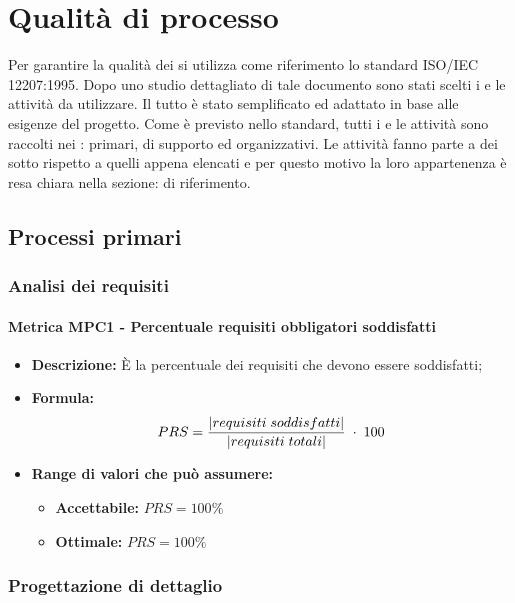 \section{Qualità di processo}
Per garantire la qualità dei  si utilizza come riferimento lo standard ISO/IEC 12207:1995. Dopo uno studio dettagliato di tale documento sono stati scelti i 
e le attività da utilizzare. Il tutto è stato semplificato ed adattato in base alle esigenze del progetto. Come è previsto nello standard, tutti i  e le attività sono raccolti 
nei : primari, di supporto ed organizzativi. Le attività fanno parte a dei sotto  rispetto a quelli appena elencati e per questo motivo la loro 
appartenenza è resa chiara nella sezione:  di riferimento.

\subsection{Processi primari}

\subsubsection{Analisi dei requisiti}
    \paragraph{Metrica MPC1 - Percentuale requisiti obbligatori soddisfatti}
    \begin{itemize}
        \item \textbf{Descrizione:} È la percentuale dei requisiti che devono essere soddisfatti;
        \item \textbf{Formula:} $$PRS = {|requisiti \; soddisfatti| \over |requisiti \; totali|}\; \cdot \; 100$$
        \item \textbf{Range di valori che può assumere:}
        \begin{itemize}
            \item \textbf{Accettabile:} $PRS = 100\%$
            \item \textbf{Ottimale:} $PRS = 100\%$
        \end{itemize}
    \end{itemize} 
\subsubsection{Progettazione di dettaglio}
